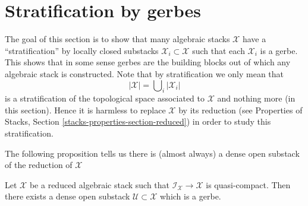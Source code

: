 \section{Stratification by gerbes}
\label{section-stratify}

\noindent
The goal of this section is to show that many algebraic stacks
$\mathcal{X}$ have a ``stratification'' by locally closed substacks
$\mathcal{X}_i \subset \mathcal{X}$ such that each $\mathcal{X}_i$ is
a gerbe. This shows that in some sense gerbes are the building blocks
out of which any algebraic stack is constructed. Note that by stratification
we only mean that
$$
|\mathcal{X}| = \bigcup\nolimits_i |\mathcal{X}_i|
$$
is a stratification of the topological space associated to $\mathcal{X}$
and nothing more (in this section). Hence it is harmless to replace
$\mathcal{X}$ by its reduction (see
Properties of Stacks, Section \ref{stacks-properties-section-reduced})
in order to study this stratification.

\medskip\noindent
The following proposition tells us there is (almost always) a dense
open substack of the reduction of $\mathcal{X}$

\begin{proposition}
\label{proposition-open-stratum}
Let $\mathcal{X}$ be a reduced algebraic stack such that
$\mathcal{I}_\mathcal{X} \to \mathcal{X}$ is quasi-compact.
Then there exists a dense open substack $\mathcal{U} \subset \mathcal{X}$
which is a gerbe.
\end{proposition}

